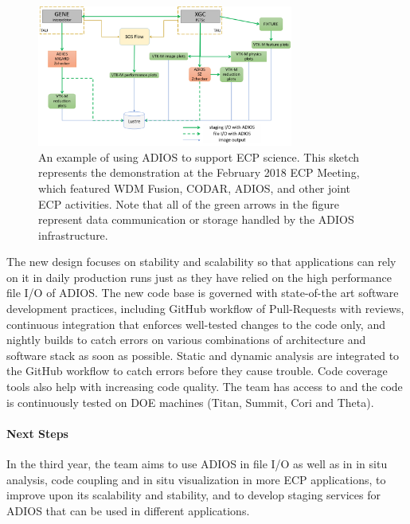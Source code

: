 \begin{figure}[!th]
	\begin{center}
		\includegraphics[width=0.75\textwidth]{projects/2.3.4-DataViz/2.3.4.09-ADIOS/ADIOS_in_ECP.png}
		\caption{An example of using ADIOS to support ECP science.  This sketch represents the demonstration at the February 2018 ECP Meeting, which featured WDM Fusion, CODAR, ADIOS, and other joint ECP activities.  Note that all of the green arrows in the figure represent data communication or storage handled by the ADIOS infrastructure.}
		\label{fig:adios-example}
	\end{center}
\end{figure}

The new design focuses on stability and scalability so that applications can rely on it in daily production runs just as they have relied on the high performance file I/O of ADIOS. The new code base is governed with state-of-the art software development practices, including GitHub workflow of Pull-Requests with reviews, continuous integration that enforces well-tested changes to the code only, and nightly builds to catch errors on various combinations of architecture and software stack as soon as possible. Static and dynamic analysis are integrated to the GitHub workflow to catch errors before they cause trouble. Code coverage tools also help with increasing code quality. The team has access to and the code is continuously tested on DOE machines (Titan, Summit, Cori and Theta). 


\paragraph{Next Steps}
In the third year, the team aims to use ADIOS in file I/O as well as in in situ analysis, code coupling and in situ visualization in more ECP applications, to improve upon its scalability and stability, and to develop staging services for ADIOS that can be used in different applications. 
